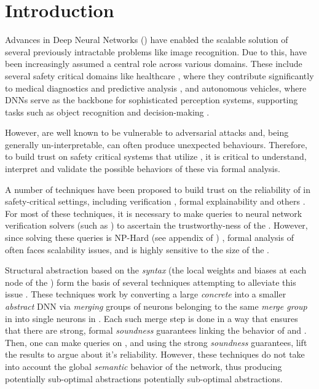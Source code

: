 
\section{Introduction}


Advances in Deep Neural Networks (\dnn) have enabled the scalable solution
of several previously intractable problems like image recognition. Due to this, \dnn have been increasingly assumed a central role
across various domains. These include several safety critical domains like
healthcare \cite{b1}, where they contribute significantly to medical diagnostics
and predictive analysis \cite{b2}, and autonomous vehicles, where DNNs serve as
the backbone for sophisticated perception systems, supporting tasks such as
object recognition and decision-making \cite{b3}. 

However, \dnn are well known to be vulnerable to adversarial attacks  and, being generally un-interpretable, can often produce unexpected
behaviours. Therefore, to build trust on safety critical systems that utilize
\dnn, it is  critical to understand, interpret and validate
the possible behaviors of these \dnn via formal analysis. 

A number of techniques have been proposed to build trust on the reliability
of \dnn in safety-critical settings, including verification \cite{reluplex,
deeppoly} , formal explainability \cite{overview-fxai,
minimal-image-fxai} and others . For most of these
techniques, it is necessary to make queries to neural network verification
solvers (such as \cite{reluplex}) to ascertain the trustworthy-ness of the \dnn.
 However, since solving these queries is NP-Hard (see appendix of
\cite{reluplex}) , formal analysis of \dnn
often faces scalability issues, and is highly sensitive to the size of the \dnn.

Structural abstraction based on the \textit{syntax} (the local weights and biases at each
node of the \dnn) form the basis of several techniques attempting to alleviate
this issue \cite{cegar-nn, cegarette, cleverest-nn, conv-abs-gk}. These
techniques work by converting a large \textit{concrete} \dnn \cnc into a smaller
\textit{abstract} DNN \abs via \textit{merging} groups of neurons belonging to
the same \textit{merge group} in \cnc into single neurons in \abs. Each such
merge step is done in a way that ensures that there are strong, formal
\textit{soundness} guarantees linking the behavior of \cnc and \abs. Then, one
can make queries on \abs, and using the strong \textit{soundness} guarantees,
lift the results to \cnc argue about it's reliability. However, these techniques
do not take into account the global \textit{semantic} behavior of the network,
thus producing potentially sub-optimal abstractions potentially sub-optimal
abstractions. 

